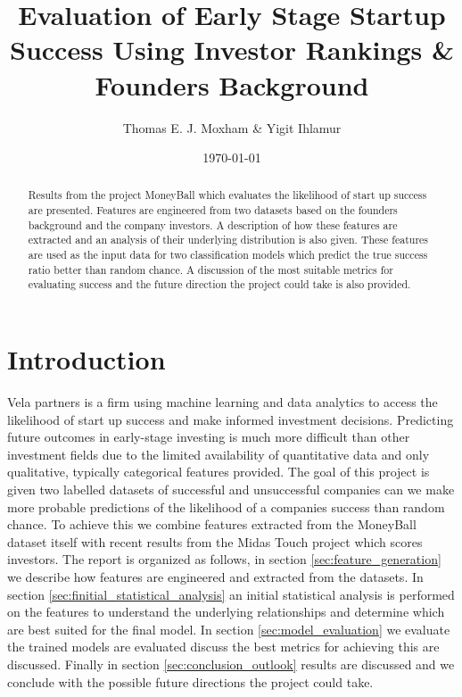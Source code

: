 \documentclass{article}
\title{Evaluation of Early Stage Startup Success Using Investor Rankings \& Founders Background} %
\author{Thomas E. J. Moxham \& Yigit Ihlamur} %
\date{\today} %
\begin{document}
\maketitle %

\begin{abstract}
\noindent Results from the project MoneyBall which evaluates the likelihood of start up success are presented. Features are engineered from two datasets based on the founders background and the company investors. A description of how these features are extracted and an analysis of their underlying distribution is also given. These features are used as the input data for two classification models which predict the true success ratio better than random chance. A discussion of the most suitable metrics for evaluating success and the future direction the project could take is also provided.
\end{abstract}


\section{Introduction}

Vela partners is a firm using machine learning and data analytics to access the likelihood of start up success and make informed investment decisions. Predicting future outcomes in early-stage investing is much more difficult than other investment fields due to the limited availability of quantitative data and only qualitative, typically categorical features provided. The goal of this project is given two labelled datasets of successful and unsuccessful companies can we make more probable predictions of the likelihood of a companies success than random chance. To achieve this we combine features extracted from the MoneyBall dataset itself with recent results from the Midas Touch project which scores investors. The report is organized as follows, in section \ref{sec:feature_generation} we describe how features are engineered and extracted from the datasets. In section \ref{sec:finitial_statistical_analysis} an initial statistical analysis is performed on the features to understand the underlying relationships and determine which are best suited for the final model. In section \ref{sec:model_evaluation} we evaluate the trained models are evaluated discuss the best metrics for achieving this are discussed. Finally in section \ref{sec:conclusion_outlook} results are discussed and we conclude with the possible future directions the project could take.
\end{document}
